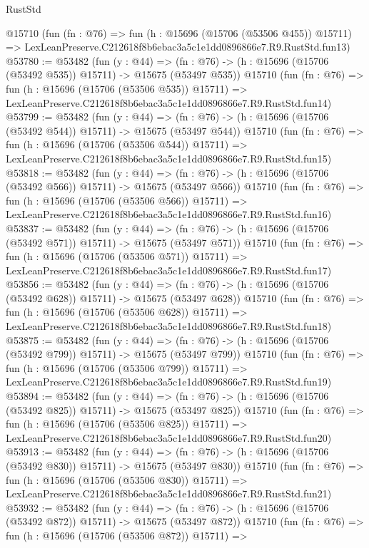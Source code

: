 \begin{lexlean}{RustStd}
\begin{coremodule}
    @15710
    (fun (fn : @76) =>
    fun (h : @15696 (@15706 (@53506 @455)) @15711) =>
    LexLeanPreserve.C212618f8b6ebac3a5c1e1dd0896866e7.R9.RustStd.fun13)
@53780 := @53482
    (fun (y : @44) =>
    (fn : @76) -> (h : @15696 (@15706 (@53492 @535)) @15711) -> @15675 (@53497 @535))
    @15710
    (fun (fn : @76) =>
    fun (h : @15696 (@15706 (@53506 @535)) @15711) =>
    LexLeanPreserve.C212618f8b6ebac3a5c1e1dd0896866e7.R9.RustStd.fun14)
@53799 := @53482
    (fun (y : @44) =>
    (fn : @76) -> (h : @15696 (@15706 (@53492 @544)) @15711) -> @15675 (@53497 @544))
    @15710
    (fun (fn : @76) =>
    fun (h : @15696 (@15706 (@53506 @544)) @15711) =>
    LexLeanPreserve.C212618f8b6ebac3a5c1e1dd0896866e7.R9.RustStd.fun15)
@53818 := @53482
    (fun (y : @44) =>
    (fn : @76) -> (h : @15696 (@15706 (@53492 @566)) @15711) -> @15675 (@53497 @566))
    @15710
    (fun (fn : @76) =>
    fun (h : @15696 (@15706 (@53506 @566)) @15711) =>
    LexLeanPreserve.C212618f8b6ebac3a5c1e1dd0896866e7.R9.RustStd.fun16)
@53837 := @53482
    (fun (y : @44) =>
    (fn : @76) -> (h : @15696 (@15706 (@53492 @571)) @15711) -> @15675 (@53497 @571))
    @15710
    (fun (fn : @76) =>
    fun (h : @15696 (@15706 (@53506 @571)) @15711) =>
    LexLeanPreserve.C212618f8b6ebac3a5c1e1dd0896866e7.R9.RustStd.fun17)
@53856 := @53482
    (fun (y : @44) =>
    (fn : @76) -> (h : @15696 (@15706 (@53492 @628)) @15711) -> @15675 (@53497 @628))
    @15710
    (fun (fn : @76) =>
    fun (h : @15696 (@15706 (@53506 @628)) @15711) =>
    LexLeanPreserve.C212618f8b6ebac3a5c1e1dd0896866e7.R9.RustStd.fun18)
@53875 := @53482
    (fun (y : @44) =>
    (fn : @76) -> (h : @15696 (@15706 (@53492 @799)) @15711) -> @15675 (@53497 @799))
    @15710
    (fun (fn : @76) =>
    fun (h : @15696 (@15706 (@53506 @799)) @15711) =>
    LexLeanPreserve.C212618f8b6ebac3a5c1e1dd0896866e7.R9.RustStd.fun19)
@53894 := @53482
    (fun (y : @44) =>
    (fn : @76) -> (h : @15696 (@15706 (@53492 @825)) @15711) -> @15675 (@53497 @825))
    @15710
    (fun (fn : @76) =>
    fun (h : @15696 (@15706 (@53506 @825)) @15711) =>
    LexLeanPreserve.C212618f8b6ebac3a5c1e1dd0896866e7.R9.RustStd.fun20)
@53913 := @53482
    (fun (y : @44) =>
    (fn : @76) -> (h : @15696 (@15706 (@53492 @830)) @15711) -> @15675 (@53497 @830))
    @15710
    (fun (fn : @76) =>
    fun (h : @15696 (@15706 (@53506 @830)) @15711) =>
    LexLeanPreserve.C212618f8b6ebac3a5c1e1dd0896866e7.R9.RustStd.fun21)
@53932 := @53482
    (fun (y : @44) =>
    (fn : @76) -> (h : @15696 (@15706 (@53492 @872)) @15711) -> @15675 (@53497 @872))
    @15710
    (fun (fn : @76) =>
    fun (h : @15696 (@15706 (@53506 @872)) @15711) =>

\end{coremodule}
\end{lexlean}
